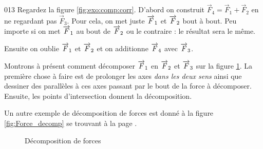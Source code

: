\begin{corrige}{013}
Regardez la figure \ref{fig:exo:comp:corr}. D'abord on construit $\overrightarrow{F}_4=\overrightarrow{F}_1+\overrightarrow{F}_2$ en ne regardant pas $\overrightarrow{F}_3$. Pour cela, on met juste $\overrightarrow{F}_1$ et $\overrightarrow{F}_2$ bout à bout. Peu importe si on met $\overrightarrow{F}_1$ au bout de $\overrightarrow{F}_2$ ou le contraire : le résultat sera le même.


Ensuite on oublie $\overrightarrow{F}_1$ et $\overrightarrow{F}_2$ et on additionne $\overrightarrow{F}_4$ avec $\overrightarrow{F}_3$.

Montrons à présent comment décomposer $\overrightarrow{F}_1$ en $\overrightarrow{F}_2$ et $\overrightarrow{F}_3$ sur la figure \ref{fig_decom013}. La première chose à faire est de prolonger les axes \emph{dans les deux sens} ainsi que dessiner des parallèles à ces axes passant par le bout de la force à décomposer. Ensuite, les points d'intersection donnent la décomposition.

Un autre exemple de décomposition de forces est donné à la figure \ref{fig:Force_decomp} se trouvant à la page \pageref{fig:Force_decomp}.

\begin{figure}[ht]
\centering
\caption{Décomposition de forces}\label{fig_decom013}
\end{figure}

\end{corrige}
